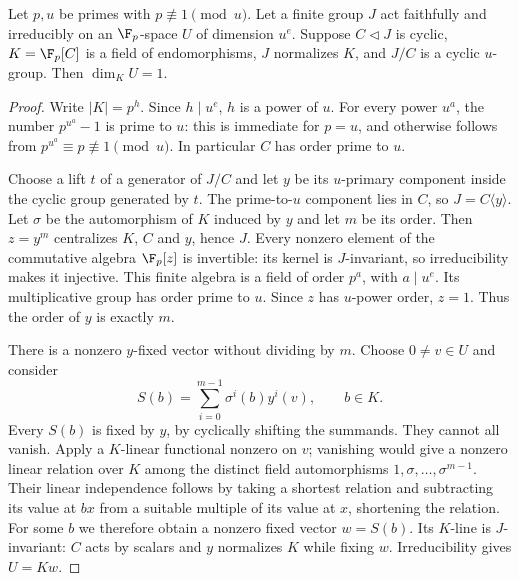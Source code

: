 \begin{lemma}\label{descent}
Let $p,u$ be primes with $p\not\equiv1\pmod u$. Let a finite group $J$
act faithfully and irreducibly on an $\F_p$-space $U$ of dimension $u^e$.
Suppose $C\triangleleft J$ is cyclic, $K=\F_p[C]$ is a field of
endomorphisms, $J$ normalizes $K$, and $J/C$ is a cyclic $u$-group.
Then $\dim_KU=1$.
\end{lemma}
\begin{proof}
Write $|K|=p^h$. Since $h\mid u^e$, $h$ is a power of $u$.
For every power $u^a$, the number $p^{u^a}-1$ is prime to $u$:
this is immediate for $p=u$, and otherwise follows from
$p^{u^a}\equiv p\not\equiv1\pmod u$. In particular $C$ has order
prime to $u$.

Choose a lift $t$ of a generator of $J/C$ and let $y$ be its
$u$-primary component inside the cyclic group generated by $t$.
The prime-to-$u$ component lies in $C$, so $J=C\langle y\rangle$.
Let $\sigma$ be the automorphism of $K$ induced by $y$ and let $m$
be its order. Then $z=y^m$ centralizes $K$, $C$ and $y$, hence $J$.
Every nonzero element of the commutative algebra $\F_p[z]$ is invertible:
its kernel is $J$-invariant, so irreducibility makes it injective. This
finite algebra is a field of order $p^a$, with $a\mid u^e$. Its
multiplicative group has order prime to $u$. Since $z$ has $u$-power
order, $z=1$. Thus the order of $y$ is exactly $m$.

There is a nonzero $y$-fixed vector without dividing by $m$. Choose
$0\ne v\in U$ and consider
\[
 S(b)=\sum_{i=0}^{m-1}\sigma^i(b)y^i(v),\qquad b\in K.
\]
Every $S(b)$ is fixed by $y$, by cyclically shifting the summands.
They cannot all vanish. Apply a $K$-linear functional nonzero on $v$;
vanishing would give a nonzero linear relation over $K$ among the
distinct field automorphisms $1,\sigma,\ldots,\sigma^{m-1}$.
Their linear independence follows by taking a shortest relation and
subtracting its value at $bx$ from a suitable multiple of its value
at $x$, shortening the relation. For some $b$ we therefore obtain a
nonzero fixed vector $w=S(b)$. Its $K$-line is $J$-invariant: $C$
acts by scalars and $y$ normalizes $K$ while fixing $w$.
Irreducibility gives $U=Kw$.
\end{proof}

